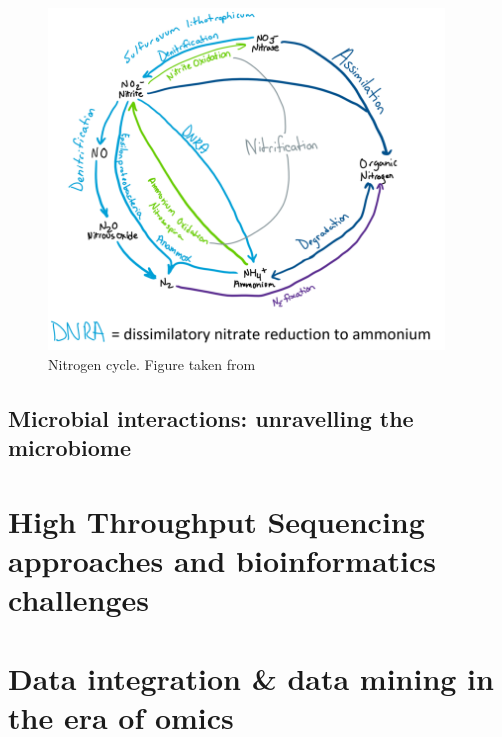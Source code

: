 \begin{figure}[h]
   \centering
   \includegraphics[width=105mm]{figures/802px-Nitrogen_cycle_of_hydrothermal_vents_2.png}
   \caption{Nitrogen cycle. Figure taken from \citep{wiki:nitrogen}}
\end{figure}





\subsection{Microbial interactions: unravelling the microbiome}




\section{High Throughput Sequencing approaches and bioinformatics challenges}






\section{Data integration \& data mining in the era of omics}


